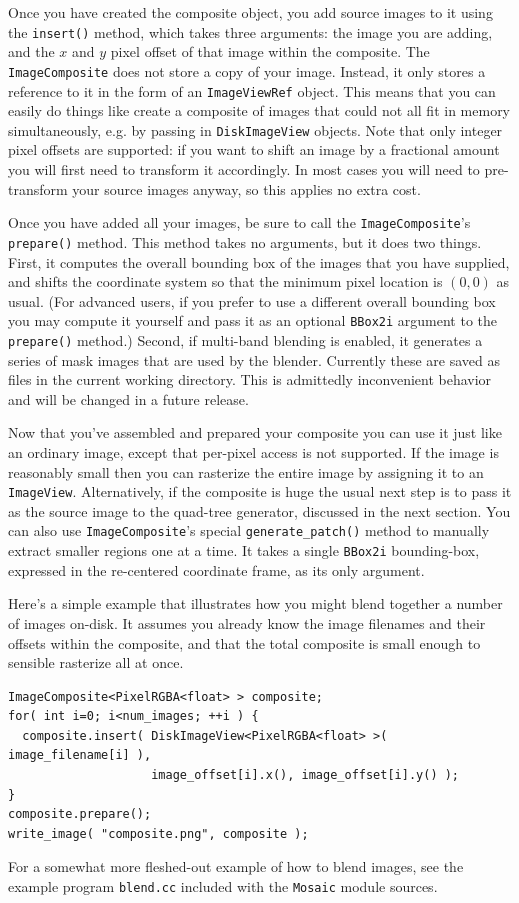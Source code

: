 Once you have created the composite object, you add source images to
it using the \verb#insert()# method, which takes three arguments: the
image you are adding, and the $x$ and $y$ pixel offset of that image
within the composite.  The \verb#ImageComposite# does not store a copy
of your image.  Instead, it only stores a reference to it in the form
of an \verb#ImageViewRef# object.  This means that you can easily do
things like create a composite of images that could not all fit in
memory simultaneously, e.g. by passing in \verb#DiskImageView#
objects.  Note that only integer pixel offsets are supported: if you
want to shift an image by a fractional amount you will first need to
transform it accordingly.  In most cases you will need to
pre-transform your source images anyway, so this applies no extra
cost.  

Once you have added all your images, be sure to call the
\verb#ImageComposite#'s \verb#prepare()# method.  This method takes no
arguments, but it does two things.  First, it computes the overall
bounding box of the images that you have supplied, and shifts the
coordinate system so that the minimum pixel location is $(0,0)$ as
usual.  (For advanced users, if you prefer to use a different overall
bounding box you may compute it yourself and pass it as an optional
\verb#BBox2i# argument to the \verb#prepare()# method.)  Second, if
multi-band blending is enabled, it generates a series of mask images
that are used by the blender.  Currently these are saved as files in
the current working directory.  This is admittedly inconvenient
behavior and will be changed in a future release.

Now that you've assembled and prepared your composite you can use 
it just like an ordinary image, except that per-pixel access is 
not supported.  If the image is reasonably small then you can 
rasterize the entire image by assigning it to an \verb#ImageView#. 
Alternatively, if the composite is huge the usual next step is to 
pass it as the source image to the quad-tree generator, discussed 
in the next section.  You can also use \verb#ImageComposite#'s 
special \verb#generate_patch()# method to manually extract smaller 
regions one at a time.  It takes a single \verb#BBox2i# bounding-box, 
expressed in the re-centered coordinate frame, as its only argument.

Here's a simple example that illustrates how you might blend 
together a number of images on-disk.  It assumes you already know 
the image filenames and their offsets within the composite, and 
that the total composite is small enough to sensible rasterize all 
at once.
\begin{verbatim}
ImageComposite<PixelRGBA<float> > composite;
for( int i=0; i<num_images; ++i ) {
  composite.insert( DiskImageView<PixelRGBA<float> >( image_filename[i] ),
                    image_offset[i].x(), image_offset[i].y() );
}
composite.prepare();
write_image( "composite.png", composite );
\end{verbatim}
For a somewhat more fleshed-out example of how to blend images, 
see the example program \verb#blend.cc# included with the 
\verb#Mosaic# module sources.

